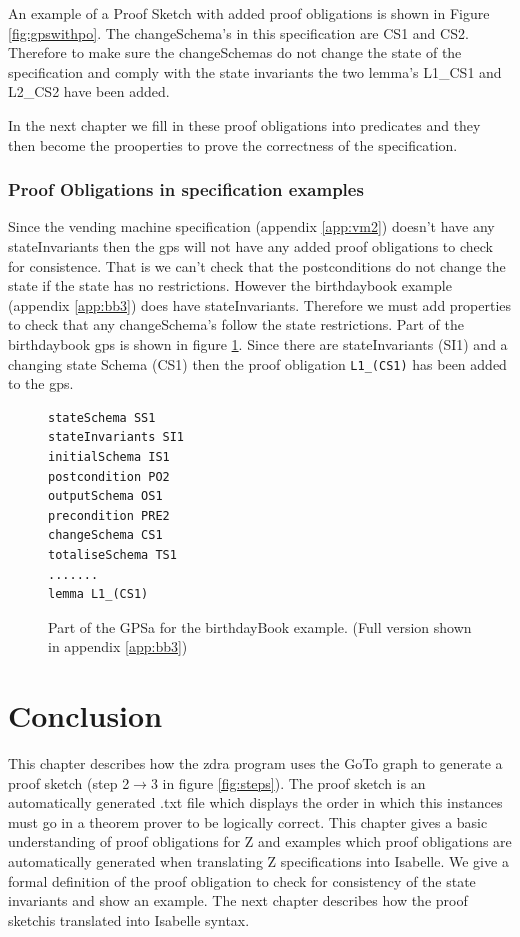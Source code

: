 An example of a Proof Sketch with added proof obligations is shown in
Figure \ref{fig:gpswithpo}. The changeSchema's in this specification are CS1 and
CS2. Therefore to make sure the changeSchemas do not change the state of the
specification and comply with the state invariants the two lemma's L1\_CS1 and
L2\_CS2 have been added.

In the next chapter we fill in these proof obligations into predicates and they 
then become the prooperties to prove the correctness of the specification.

\subsubsection{Proof Obligations in specification examples}
Since the vending machine specification (appendix \ref{app:vm2}) doesn't have
any stateInvariants then the \gls{gps} will not have any added proof
obligations to check for consistence. That is we can't check that the
postconditions do not change the state if the state has no restrictions. However
the birthdaybook example (appendix \ref{app:bb3}) does have stateInvariants.
Therefore we must add properties to check that any changeSchema's follow the
state restrictions. Part of the birthdaybook \gls{gps} is shown in figure
\ref{fig:bbgps}. Since there are stateInvariants (SI1) and a changing state
Schema (CS1) then the proof obligation \texttt{L1\_(CS1)} has been added to the
\gls{gps}.

\begin{figure}[H]
\begin{verbatim}
stateSchema SS1 
stateInvariants SI1 
initialSchema IS1 
postcondition PO2 
outputSchema OS1 
precondition PRE2 
changeSchema CS1 
totaliseSchema TS1 
.......
lemma L1_(CS1) 
\end{verbatim}
\caption{Part of the GPSa for the birthdayBook example. (Full version shown in appendix \ref{app:bb3}) \label{fig:bbgps}}
\end{figure}

\section{Conclusion}
\label{sec:skeletonsConclusion}

This chapter describes how the \gls{zdra} program uses the GoTo graph to
generate a proof sketch (step 2$\rightarrow$3 in figure
\ref{fig:steps}). The proof sketch is an automatically generated .txt
file which displays the order in which this instances must go in a theorem
prover to be logically correct. This chapter gives a basic understanding of
proof obligations for Z and examples which proof obligations are automatically
generated when translating Z specifications into Isabelle. We give a formal
definition of the proof obligation to check for consistency of the state
invariants and show an example. The next chapter describes how the proof
sketchis translated into Isabelle syntax.
